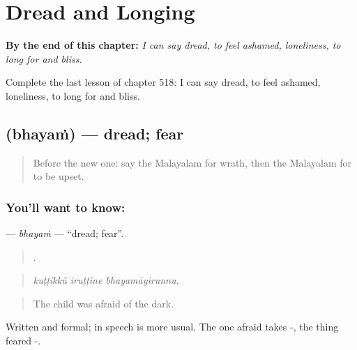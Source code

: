 
\chapter{Dread and Longing}
\label{ch:ml-dread-and-longing}

\begin{chapteropening}
\textbf{By the end of this chapter:} \emph{I can say dread, to feel ashamed, loneliness, to long for and bliss.}

Complete the last lesson of chapter 518: I can say dread, to feel ashamed, loneliness, to long for and bliss.
\end{chapteropening}

\section[\texorpdfstring{\ml{ഭയം} (bhayaṁ)}{ഭയം (bhayaṁ)}]{ (bhayaṁ) — dread; fear}

\label{lesson:ML-C518-bhayam}



\begin{quote}
Before the new one: say the Malayalam for wrath, then the Malayalam for to be upset.
\end{quote}

\subsection*{You'll want to know: }
\textbf{} — \emph{bhayaṁ} — \textquotedblleft{}dread; fear\textquotedblright{}.

\begin{quote}
  .
\end{quote}

\begin{quote}
\emph{kuṭṭikkŭ iruṭṭine bhayamāyirunnu.}
\end{quote}

\begin{quote}
The child was afraid of the dark.
\end{quote}

Written and formal; in speech  is more usual. The one afraid takes -, the thing feared -.

